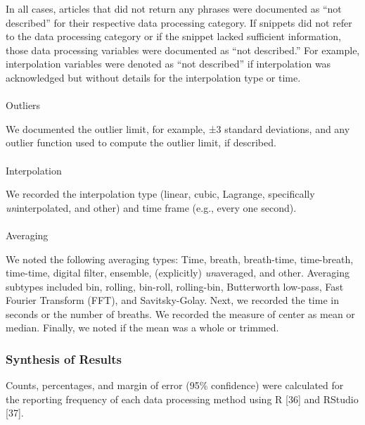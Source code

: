 \documentclass[
  letterpaper,
  DIV=11,
  numbers=noendperiod]{scrartcl}
\makeatletter
\let\oldparagraph\paragraph
\renewcommand{\paragraph}{
    \@ifstar
      \xxxParagraphStar
      \xxxParagraphNoStar
  }
\newcommand{\xxxParagraphStar}[1]{\oldparagraph*{#1}\mbox{}}
\newcommand{\xxxParagraphNoStar}[1]{\oldparagraph{#1}\mbox{}}
\makeatother
\begin{document}
In all cases, articles that did not return any phrases were documented
as ``not described'' for their respective data processing category. If
snippets did not refer to the data processing category or if the snippet
lacked sufficient information, those data processing variables were
documented as ``not described.'' For example, interpolation variables
were denoted as ``not described'' if interpolation was acknowledged but
without details for the interpolation type or time.

\paragraph{Outliers}\label{outliers-1}

We documented the outlier limit, for example, ±3 standard deviations,
and any outlier function used to compute the outlier limit, if
described.

\paragraph{Interpolation}\label{interpolation-1}

We recorded the interpolation type (linear, cubic, Lagrange,
specifically \emph{un}interpolated, and other) and time frame (e.g.,
every one second).

\paragraph{Averaging}\label{averaging-1}

We noted the following averaging types: Time, breath, breath-time,
time-breath, time-time, digital filter, ensemble, (explicitly)
\emph{un}averaged, and other. Averaging subtypes included bin, rolling,
bin-roll, rolling-bin, Butterworth low-pass, Fast Fourier Transform
(FFT), and Savitsky-Golay. Next, we recorded the time in seconds or the
number of breaths. We recorded the measure of center as mean or median.
Finally, we noted if the mean was a whole or trimmed.

\subsubsection{Synthesis of Results}\label{synthesis-of-results}

Counts, percentages, and margin of error (95\% confidence) were
calculated for the reporting frequency of each data processing method
using R {[}36{]} and RStudio {[}37{]}.
\end{document}
